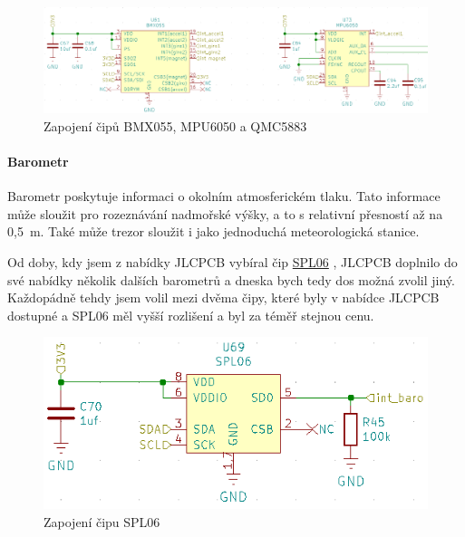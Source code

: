 \begin{figure}[htbp]
    \centering
    \includegraphics[width=\textwidth]{kapitoly/obrazky/E4/vnimani/BMX-MPU.png}
    \caption{Zapojení čipů BMX055, MPU6050 a QMC5883}
    \label{fig:E4-9axis}
\end{figure}

\newpage

\paragraph{Barometr}
Barometr poskytuje informaci o okolním atmosferickém tlaku. Tato informace může sloužit pro rozeznávání nadmořské výšky, a to s relativní přesností až na 0,5~m. Také může trezor sloužit 
i jako jednoduchá meteorologická stanice.

Od doby, kdy jsem z nabídky JLCPCB vybíral čip \href{https://datasheet.lcsc.com/szlcsc/1907081118_Goertek-SPL06-007_C233787.pdf}{SPL06} \parencite{spl06}, 
JLCPCB doplnilo do své nabídky několik dalších barometrů a dneska bych tedy dos možná zvolil jiný. Každopádně tehdy jsem volil 
mezi dvěma čipy, které byly v nabídce JLCPCB dostupné a SPL06 měl vyšší rozlišení a byl za téměř stejnou cenu.

\begin{figure}[htbp]
    \centering
    \includegraphics[width=\textwidth]{kapitoly/obrazky/E4/vnimani/SPL06.png}
    \caption{Zapojení čipu SPL06}
    \label{fig:E4-SPL06}
\end{figure}

\newpage

